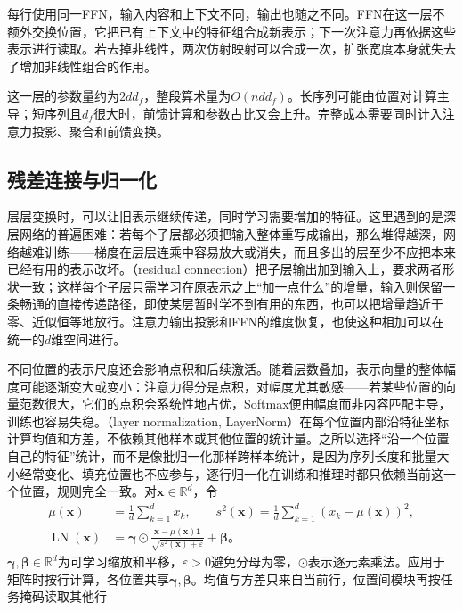 每行使用同一FFN，输入内容和上下文不同，输出也随之不同。FFN在这一层不额外交换位置，它把已有上下文中的特征组合成新表示；下一次注意力再依据这些表示进行读取。若去掉非线性，两次仿射映射可以合成一次，扩张宽度本身就失去了增加非线性组合的作用。

这一层的参数量约为$2dd_f$，整段算术量为$O(ndd_f)$。长序列可能由位置对计算主导；短序列且$d_f$很大时，前馈计算和参数占比又会上升。完整成本需要同时计入注意力投影、聚合和前馈变换。

\subsection{残差连接与归一化}
\label{sec:transformer-residual-normalization}

层层变换时，可以让旧表示继续传递，同时学习需要增加的特征。这里遇到的是深层网络的普遍困难：若每个子层都必须把输入整体重写成输出，那么堆得越深，网络越难训练——梯度在层层连乘中容易放大或消失，而且多出的层至少不应把本来已经有用的表示改坏。（residual connection）把子层输出加到输入上，要求两者形状一致；这样每个子层只需学习在原表示之上“加一点什么”的增量，输入则保留一条畅通的直接传递路径，即使某层暂时学不到有用的东西，也可以把增量趋近于零、近似恒等地放行。注意力输出投影和FFN的维度恢复，也使这种相加可以在统一的$d$维空间进行。

不同位置的表示尺度还会影响点积和后续激活。随着层数叠加，表示向量的整体幅度可能逐渐变大或变小：注意力得分是点积，对幅度尤其敏感——若某些位置的向量范数很大，它们的点积会系统性地占优，Softmax便由幅度而非内容匹配主导，训练也容易失稳。（layer normalization, LayerNorm）在每个位置内部沿特征坐标计算均值和方差，不依赖其他样本或其他位置的统计量。之所以选择“沿一个位置自己的特征”统计，而不是像批归一化那样跨样本统计，是因为序列长度和批量大小经常变化、填充位置也不应参与，逐行归一化在训练和推理时都只依赖当前这一个位置，规则完全一致。对$\bm x\in\mathbb R^d$，令
\begin{equation}
  \begin{aligned}
    \mu(\bm x)&=\frac1d\sum_{k=1}^d x_k,\qquad
    s^2(\bm x)=\frac1d\sum_{k=1}^d(x_k-\mu(\bm x))^2,\\
    \operatorname{LN}(\bm x)
      &=\bm\gamma\odot
        \frac{\bm x-\mu(\bm x)\bm 1}{\sqrt{s^2(\bm x)+\varepsilon}}
        +\bm\beta\text{。}
  \end{aligned}
  \label{eq:transformer-layernorm}
\end{equation}
$\bm\gamma,\bm\beta\in\mathbb R^d$为可学习缩放和平移，$\varepsilon>0$避免分母为零，$\odot$表示逐元素乘法。应用于矩阵时按行计算，各位置共享$\bm\gamma,\bm\beta$。均值与方差只来自当前行，位置间模块再按任务掩码读取其他行

